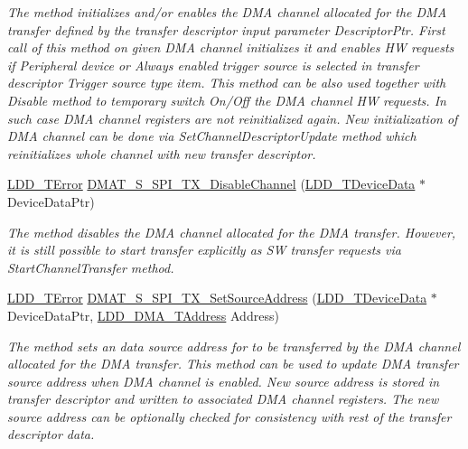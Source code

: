 \begin{DoxyCompactItemize}
\begin{DoxyCompactList}\small\item\em The method initializes and/or enables the D\-M\-A channel allocated for the D\-M\-A transfer defined by the transfer descriptor input parameter Descriptor\-Ptr. First call of this method on given D\-M\-A channel initializes it and enables H\-W requests if Peripheral device or Always enabled trigger source is selected in transfer descriptor Trigger source type item. This method can be also used together with Disable method to temporary switch On/\-Off the D\-M\-A channel H\-W requests. In such case D\-M\-A channel registers are not reinitialized again. New initialization of D\-M\-A channel can be done via Set\-Channel\-Descriptor\-Update method which reinitializes whole channel with new transfer descriptor. \end{DoxyCompactList}\item 
\hyperlink{group___p_e___types__module_ga24c2b045fd04e79e85f261ce4df35588}{L\-D\-D\-\_\-\-T\-Error} \hyperlink{group___d_m_a_t___s___s_p_i___t_x__module_ga181b8a0f23d6295dfe87d2fccc5a60e0}{D\-M\-A\-T\-\_\-\-S\-\_\-\-S\-P\-I\-\_\-\-T\-X\-\_\-\-Disable\-Channel} (\hyperlink{group___p_e___types__module_gac5cf1362f1f0e3a2ce71b1bf2276d091}{L\-D\-D\-\_\-\-T\-Device\-Data} $\ast$Device\-Data\-Ptr)
\begin{DoxyCompactList}\small\item\em The method disables the D\-M\-A channel allocated for the D\-M\-A transfer. However, it is still possible to start transfer explicitly as S\-W transfer requests via Start\-Channel\-Transfer method. \end{DoxyCompactList}\item 
\hyperlink{group___p_e___types__module_ga24c2b045fd04e79e85f261ce4df35588}{L\-D\-D\-\_\-\-T\-Error} \hyperlink{group___d_m_a_t___s___s_p_i___t_x__module_ga2cc9601ddecfccead74aae54533d9c22}{D\-M\-A\-T\-\_\-\-S\-\_\-\-S\-P\-I\-\_\-\-T\-X\-\_\-\-Set\-Source\-Address} (\hyperlink{group___p_e___types__module_gac5cf1362f1f0e3a2ce71b1bf2276d091}{L\-D\-D\-\_\-\-T\-Device\-Data} $\ast$Device\-Data\-Ptr, \hyperlink{group___p_e___types__module_gab8287f62db7ff96992355760b652cd07}{L\-D\-D\-\_\-\-D\-M\-A\-\_\-\-T\-Address} Address)
\begin{DoxyCompactList}\small\item\em The method sets an data source address for to be transferred by the D\-M\-A channel allocated for the D\-M\-A transfer. This method can be used to update D\-M\-A transfer source address when D\-M\-A channel is enabled. New source address is stored in transfer descriptor and written to associated D\-M\-A channel registers. The new source address can be optionally checked for consistency with rest of the transfer descriptor data. \end{DoxyCompactList}\item 

\end{DoxyCompactItemize}
